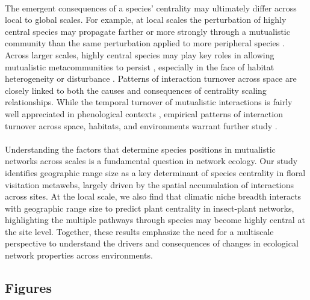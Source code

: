 \documentclass[12pt]{article}
\begin{document}
\paragraph*{}
The emergent consequences of a species' centrality may ultimately differ across local to global scales. For example, at local scales the perturbation of highly central species may propagate farther or more strongly through a mutualistic community than the same perturbation applied to more peripheral species \citep{Cauga2019, delmas2019analysing, martins2024propagation}. Across larger scales, highly central species may play key roles in allowing mutualistic metacommunities to persist \citep{filotas2010effect}, especially in the face of habitat heterogeneity or disturbance \citep{prakash2004habitat}. Patterns of interaction turnover across space are closely linked to both the causes and consequences of centrality scaling relationships. While the temporal turnover of mutualistic interactions is fairly well appreciated in phenological contexts \citep{olesen2008temporal, chavez2020drivers}, empirical patterns of interaction turnover across space, habitats, and environments warrant further study \citep{tylianakis2017ecological}. 


\paragraph*{}
Understanding the factors that determine species positions in mutualistic networks across scales is a fundamental question in network ecology. Our study identifies geographic range size as a key determinant of species centrality in floral visitation metawebs, largely driven by the spatial accumulation of interactions across sites. At the local scale, we also find that climatic niche breadth interacts with geographic range size to predict plant centrality in insect-plant networks, highlighting the multiple pathways through species may become highly central at the site level. Together, these results emphasize the need for a multiscale perspective to understand the drivers and consequences of changes in ecological network properties across environments. 




\clearpage



\clearpage
\subsection*{Figures}
\end{document}
